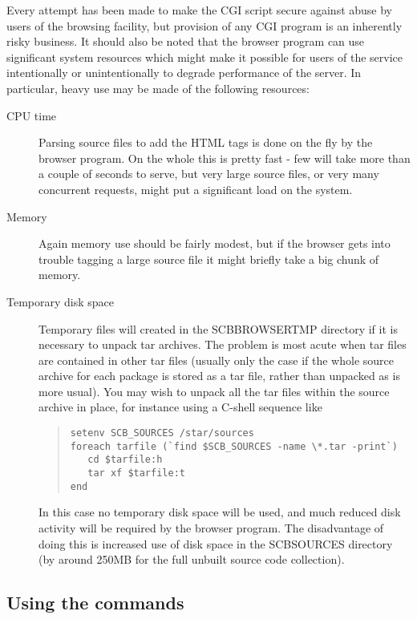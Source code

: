 \documentclass[twoside,11pt]{article}
\newcommand{\xlabel}[1]{}
\renewcommand{\_}{\texttt{\symbol{95}}}
\begin{document}
Every attempt has been made to make the CGI script secure against
abuse by users of the browsing facility,
but provision of any CGI program is an inherently risky business.
It should also be noted that the browser
program can use significant system resources which might
make it possible for users of the service intentionally or
unintentionally to degrade performance of the server.
In particular, heavy use may be made of the following resources:
\begin{description}
\item[CPU time]
Parsing source files to add the HTML tags is done on the fly by
the browser program.
On the whole this is pretty fast - few will take more than a couple of
seconds to serve, but very large source files, or very many concurrent
requests, might put a significant load on the system.
\item[Memory]
Again memory use should be fairly modest, but if the browser gets into
trouble tagging a large source file it might briefly take a big
chunk of memory.
\item[Temporary disk space]
Temporary files will created in the SCB\_BROWSER\_TMP directory
if it is necessary to unpack tar archives.  The problem is most acute
when tar files are contained in other tar files (usually only the
case if the whole source archive for each package is stored as a tar file,
rather than unpacked as is more usual).
You may wish to
unpack all the tar files within the source archive in place,
for instance using a C-shell sequence like
\begin{quote}
\begin{verbatim}
setenv SCB_SOURCES /star/sources
foreach tarfile (`find $SCB_SOURCES -name \*.tar -print`)
   cd $tarfile:h
   tar xf $tarfile:t
end
\end{verbatim}
\end{quote}
In this case no temporary disk space will be used, and much reduced disk
activity will be required by the browser program.
The disadvantage of doing this is increased use of disk space
in the SCB\_SOURCES directory
(by around 250MB for the full unbuilt source code collection).
\end{description}


\subsection{\xlabel{sec:startup}\label{sec:startup}Using the commands}
\end{document}
